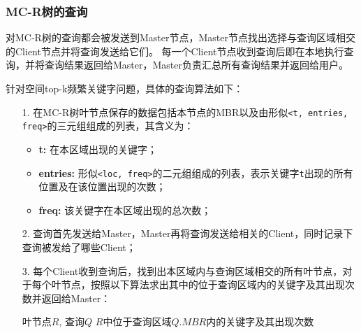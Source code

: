 \documentclass{elegantpaper}
\begin{document}
\subsubsection{MC-R树的查询}

对MC-R树的查询都会被发送到Master节点，Master节点找出选择与查询区域相交的Client节点并将查询发送给它们。
每一个Client节点收到查询后即在本地执行查询，并将查询结果返回给Master，Master负责汇总所有查询结果并返回给用户。

\noindent 针对空间top-k频繁关键字问题，具体的查询算法如下：

\begin{itemize}
    
    \item[1.] 在MC-R树叶节点保存的数据包括本节点的MBR以及由形似\verb|<t, entries, freq>|的三元组组成的列表，其含义为：
              
              \begin{itemize}
                  
                \item {\bfseries t:} 在本区域出现的关键字；
                
                \item {\bfseries entries:} 形似\verb|<loc, freq>|的二元组组成的列表，表示关键字\verb|t|出现的所有位置及在该位置出现的次数；
                
                \item {\bfseries freq:} 该关键字在本区域出现的总次数；

              \end{itemize}

    \item[2.] 查询首先发送给Master，Master再将查询发送给相关的Client，同时记录下查询被发给了哪些Client；
    
    \item[3.] 每个Client收到查询后，找到出本区域内与查询区域相交的所有叶节点，对于每个叶节点，按照以下算法求出其中的位于查询区域内的关键字及其出现次数并返回给Master：
    
              \begin{algorithm}

                \begin{algorithmic}[1]

                    \Require 叶节点$R$, 查询$Q$
                    \Ensure $R$中位于查询区域$Q.MBR$内的关键字及其出现次数


\end{algorithmic}
\end{algorithm}
\end{itemize}
\end{document}
